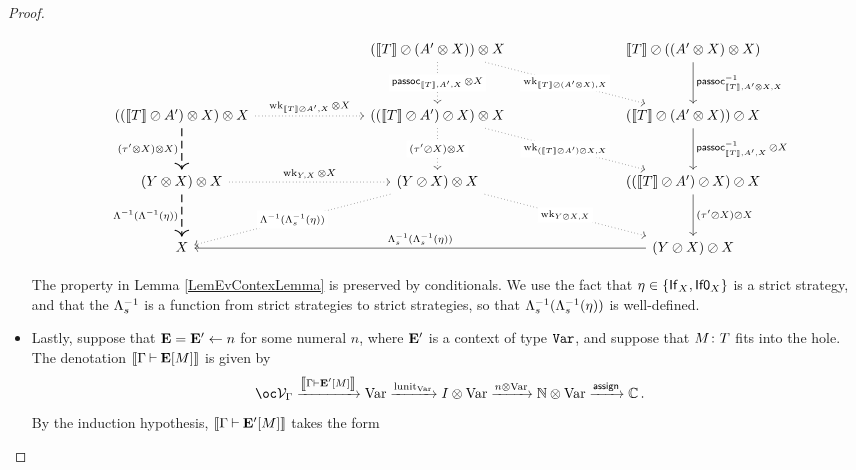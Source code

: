 \documentclass[11pt]{report}
\begin{document}
\begin{proof}
\begin{itemize}
\begin{SidewaysFigure}
\[\begin{tikzcd}[ampersand replacement=\&, column sep=78pt, row sep=30pt]
              \& (\deno T \sequoid (A' \tensor X))\tensor X \arrow[dr, "{\wk_{\deno T\sequoid (A'\tensor X),X}}" description, dotted] \arrow[d, "{\passoc_{\deno T,A',X}\tensor X}" description, dotted]
                \& \deno T \sequoid ((A' \tensor X)\tensor X) \arrow[d, "{\passoc_{\deno T,A'\tensor X,X}\inv}"] \\
            ((\deno T\sequoid A') \tensor X) \tensor X \arrow[r, "{\wk_{\deno T \sequoid A',X}\tensor X}", dotted] \arrow[d, "(\tau'\tensor X)\tensor X)"', thick, dashed]
              \& ((\deno T \sequoid A') \sequoid X) \tensor X \arrow[dr, "{\wk_{(\deno T\sequoid A') \sequoid X,X}}" description, dotted] \arrow[d, "(\tau'\sequoid X)\tensor X" description, dotted]
                \& (\deno T \sequoid (A' \tensor X)) \sequoid X \arrow[d, "{\passoc_{\deno T,A',X}\inv\sequoid X}"] \\
            (Y \tensor X) \tensor X \arrow[r, "{\wk_{Y,X}\tensor X}", dotted] \arrow[d, "\Lambda\inv(\Lambda\inv(\eta))"', thick, dashed]
              \& (Y \sequoid X) \tensor X \arrow[dr, "{\wk_{Y\sequoid X,X}}" description, dotted] \arrow[dl, "\Lambda\inv(\Lambda_s\inv(\eta))" description, dotted]
                \& ((\deno T \sequoid A') \sequoid X) \sequoid X \arrow[d, "(\tau'\sequoid X) \sequoid X"] \\
            X
              \&
                \& (Y \sequoid X)\sequoid X \arrow[ll, "\Lambda_s\inv(\Lambda_s\inv(\eta))"']
          \end{tikzcd}
          \]
          \normalsize
        \caption[The property in Lemma \ref{LemEvContexLemma} is preserved by conditionals.]{The property in Lemma \ref{LemEvContexLemma} is preserved by conditionals.
        We use the fact that $\eta\in\{\operatorname{\mathsf{If}}_X,\operatorname{{\mathsf{If0}}}_X\}$ is a strict strategy, and that the $\Lambda_s^{-1}$ is a function from strict strategies to strict strategies, so that $\Lambda_s^{-1}(\Lambda_s^{-1}(\eta))$ is well-defined.}
        \label{FigEvContextCond}
      \end{SidewaysFigure}
    \item Lastly, suppose that ${\mathbf{E}} = {\mathbf{E}}' \gets n$ for some numeral $n$, where ${\mathbf{E}}'$ is a context of type ${\mathtt{Var}}$, and suppose that $M\colon T$ fits into the hole.  
      The denotation $\left\llbracket\Gamma\mathbin{\vdash} {\mathbf{E}}[M]\right\rrbracket$ is given by
      \[
        \oc\V_\Gamma \xrightarrow{\deno{\Gamma\ts \EE'[M]}} \Varr \xrightarrow{\lunit_{\Varr}} I \tensor \Varr \xrightarrow{n\tensor\Varr} \bN \tensor \Varr \xrightarrow{\assign} \bC\,.
        \]
      By the induction hypothesis, $\left\llbracket\Gamma\mathbin{\vdash}{\mathbf{E}}'[M]\right\rrbracket$ takes the form

\end{itemize}
\end{proof}
\end{document}

